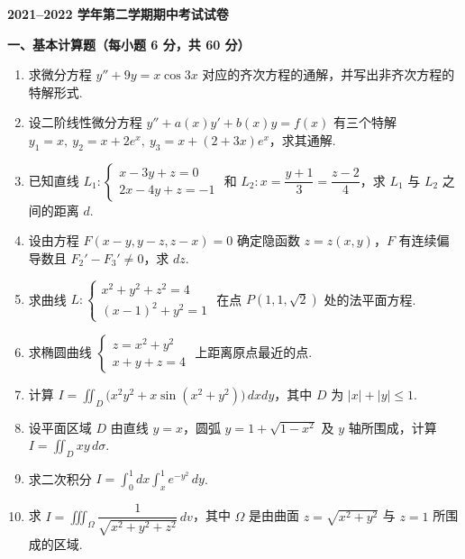\documentclass[a4paper,11pt]{ctexart}
\begin{document}
\begin{center}
  {\Large\bfseries 2021--2022 学年第二学期期中考试试卷}
\end{center}

\vspace{0.6em}

\textbf{一、基本计算题（每小题 6 分，共 60 分）}

\begin{enumerate}[label=\arabic*、, leftmargin=2.2em, itemsep=0.9em, topsep=0.6em]
  \item 求微分方程 $y'' + 9y = x\cos 3x$ 对应的齐次方程的通解，并写出非齐次方程的特解形式.

  \item 设二阶线性微分方程 $y'' + a(x)y' + b(x)y = f(x)$ 有三个特解 $y_1 = x,\ y_2 = x + 2e^x,\ y_3 = x + (2+3x)e^x$，求其通解.

  \item 已知直线 $L_1: \begin{cases} x - 3y + z = 0 \\ 2x - 4y + z = -1 \end{cases}$ 和 $L_2: x = \dfrac{y+1}{3} = \dfrac{z-2}{4}$，求 $L_1$ 与 $L_2$ 之间的距离 $d$.

  \item 设由方程 $F(x-y, y-z, z-x) = 0$ 确定隐函数 $z = z(x,y)$，$F$ 有连续偏导数且 $F_2' - F_3' \neq 0$，求 $dz$.

  \item 求曲线 $L: \begin{cases} x^2 + y^2 + z^2 = 4 \\ (x-1)^2 + y^2 = 1 \end{cases}$ 在点 $P(1,1,\sqrt{2})$ 处的法平面方程.

  \item 求椭圆曲线 $\begin{cases} z = x^2 + y^2 \\ x + y + z = 4 \end{cases}$ 上距离原点最近的点.

  \item 计算 $I = \displaystyle\iint_D \big(x^2y^2 + x\sin(x^2+y^2)\big)\,dxdy$，其中 $D$ 为 $|x| + |y| \le 1$.

  \item 设平面区域 $D$ 由直线 $y=x$，圆弧 $y = 1 + \sqrt{1-x^2}$ 及 $y$ 轴所围成，计算 $I = \displaystyle\iint_D xy\,d\sigma$.

  \item 求二次积分 $I = \displaystyle\int_0^1 dx \int_x^1 e^{-y^2}\,dy$.

  \item 求 $I = \displaystyle\iiint_\Omega \dfrac{1}{\sqrt{x^2+y^2+z^2}}\,dv$，其中 $\Omega$ 是由曲面 $z = \sqrt{x^2+y^2}$ 与 $z = 1$ 所围成的区域.
\end{enumerate}
\end{document}
